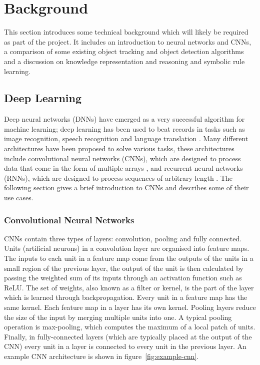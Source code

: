 \documentclass[../interim.tex]{subfiles}
\begin{document}
\section{Background}

This section introduces some technical background which will likely be required as part of the project. It includes an introduction to neural networks and CNNs, a comparison of some existing object tracking and object detection algorithms and a discussion on knowledge representation and reasoning and symbolic rule learning.

\subsection{Deep Learning}

Deep neural networks (DNNs) have emerged as a very successful algorithm for machine learning; deep learning has been used to beat records in tasks such as image recognition, speech recognition and language translation \cite{deep-learning-intro}. Many different architectures have been proposed to solve various tasks, these architectures include convolutional neural networks (CNNs), which are designed to process data that come in the form of multiple arrays \cite{deep-learning-intro}, and recurrent neural networks (RNNs), which are designed to process sequences of arbitrary length \cite{def:rnn}. The following section gives a brief introduction to CNNs and describes some of their use cases.

\subsubsection{Convolutional Neural Networks}

CNNs contain three types of layers: convolution, pooling and fully connected. Units (artificial neurons) in a convolution layer are organised into feature maps. The inputs to each unit in a feature map come from the outputs of the units in a small region of the previous layer, the output of the unit is then calculated by passing the weighted sum of its inputs through an activation function such as ReLU. The set of weights, also known as a filter or kernel, is the part of the layer which is learned through backpropagation. Every unit in a feature map has the same kernel. Each feature map in a layer has its own kernel. Pooling layers reduce the size of the input by merging multiple units into one. A typical pooling operation is max-pooling, which computes the maximum of a local patch of units. Finally, in fully-connected layers (which are typically placed at the output of the CNN) every unit in a layer is connected to every unit in the previous layer. An example CNN architecture is shown in figure~\ref{fig:example-cnn}.
\end{document}
